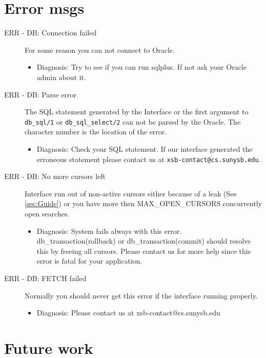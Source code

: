 \section{Error msgs}

\begin{description}
\item[ERR - DB: Connection failed] For some reason you can not connect
	to Oracle.
	\begin{itemize}
	\item	Diagnosis: Try to see if you can run sqlplus.
		If not ask your Oracle admin about it.
	\end{itemize}

\item[ERR - DB: Parse error] The SQL statement generated by the
	Interface or the first argument to {\tt db\_sql/1} or 
	{\tt db\_sql\_select/2} can not be parsed by the Oracle.
	The character number is the location of the error. 
	\begin{itemize}
	\item	Diagnosis: Check your SQL statement.  If our interface
		generated the erroneous statement please contact us at
		{\tt xsb-contact@cs.sunysb.edu}.
	\end{itemize}

\item[ERR - DB: No more cursors left] Interface run out of non-active
cursors either because of a leak (See \ref{sec:Guide}) or you have more then MAX\_OPEN\_CURSORS concurrently open
searches.
\begin{itemize}

\item Diagnosis: System fails always with this error.  db\_transaction(rollback) or
	   db\_transaction(commit) should resolve this by freeing all cursors.
	   Please contact us for more help since this error is fatal for your
	   application.
\end{itemize}

\item[ERR - DB: FETCH failed] Normally you should never get this error if the 
interface running properly.
\begin{itemize}

\item Diagnosis: Please contact us at xsb-contact@cs.sunysb.edu
\end{itemize}

\end{description}


\section{Future work}


